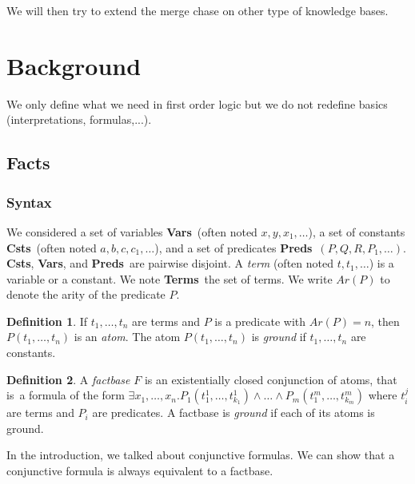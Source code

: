 \documentclass{article}
\theoremstyle{definition}
\newtheorem{definition}{Definition}[section]
\theoremstyle{remark}
\newcommand{\Vars}{\textbf{Vars}}
\newcommand{\Terms}{\textbf{Terms}}
\newcommand{\Preds}{\textbf{Preds}}
\newcommand{\Csts}{\textbf{Csts}}
\begin{document}
We will then try to extend the merge chase on other type of knowledge bases.

\tableofcontents					%
\section{Background}

We only define what we need in first order logic but we do not redefine basics (interpretations, formulas,...).

\subsection{Facts}

\subsubsection{Syntax}

We considered a set of variables \Vars\ (often noted $x,y,x_{1},\ldots$), a set of constants \Csts\ (often noted $a,b,c,c_{1},\ldots$), and a set of predicates \Preds\ $(P,Q,R,P_{1},\ldots)$. \Csts, \Vars, and \Preds\ are pairwise disjoint. A \emph{term}  (often noted $t,t_{1},\ldots$) is a variable or a constant. We note \Terms\ the set of terms. We write \emph{$\textit{Ar}(P)$} to denote the arity of the predicate $P$. 

\begin{definition}
If $t_1,\ldots,t_n$ are terms and $P$ is a predicate with $Ar(P) = n$, then $P(t_{1},\ldots,t_{n})$ is an \emph{atom}. The atom $P(t_{1},\ldots,t_{n})$ is \emph{ground} if $t_1,\ldots,t_n$ are constants.
\end{definition}

\begin{definition}
A \emph{factbase} $F$ is an existentially closed conjunction of atoms, that is\ a formula of the form $\exists x_{1},\ldots,x_{n}.P_{1}(t_{1}^{1},\ldots,t_{k_{1}}^{1})\land \ldots\land P_{m}(t_{1}^{m},\ldots,t_{k_{m}}^{m})$ where $t_i^j$ are terms and $P_i$ are predicates. A factbase is \emph{ground} if each of its atoms is ground.
\end{definition}

In the introduction, we talked about conjunctive formulas. We can show that a conjunctive formula is always equivalent to a factbase.
\end{document}
